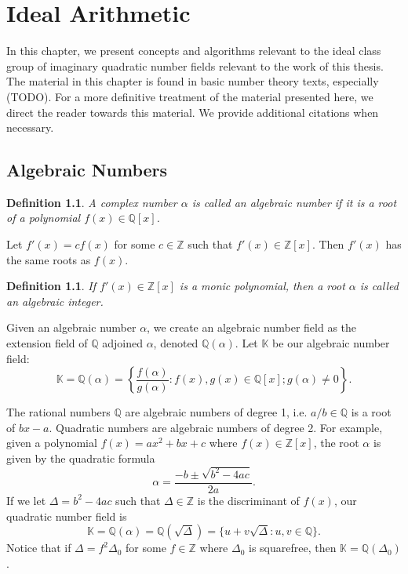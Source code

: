 \documentclass{ucalgthes1}
\newtheorem{defn}[thm]{Definition}
\newcommand{\KK}{\mathbb{K}}
\newcommand{\ZZ}{\mathbb{Z}}
\newcommand{\QQ}{\mathbb{Q}}
\begin{document}
\setcounter{chapter}{1}
\chapter{Ideal Arithmetic}

In this chapter, we present concepts and algorithms relevant to the ideal class group of imaginary quadratic number fields relevant to the work of this thesis.  The material in this chapter is found in basic number theory texts, especially (TODO).  For a more definitive treatment of the material presented here, we direct the reader towards this material.  We provide additional citations when necessary.  

\section{Algebraic Numbers}

\begin{defn}
A complex number $\alpha$ is called an \emph{algebraic number} if it is a root of a polynomial $f(x) \in \QQ[x]$.
\end{defn}
Let $f'(x) = cf(x)$ for some $c \in \ZZ$ such that $f'(x) \in \ZZ[x]$.  Then $f'(x)$ has the same roots as $f(x)$.  
\begin{defn}
If $f'(x) \in \ZZ[x]$ is a monic polynomial, then a root $\alpha$ is called an \emph{algebraic integer}. 
\end{defn}
Given an algebraic number $\alpha$, we create an algebraic number field as the extension field of $\QQ$ adjoined $\alpha$, denoted $\QQ(\alpha)$. Let $\KK$ be our algebraic number field:
\[
	\KK = \QQ(\alpha) = \left\{ \frac{f(\alpha)}{g(\alpha)} : f(x), g(x) \in \QQ[x]; g(\alpha) \ne 0 \right\}.
\]

\bigbreak
The rational numbers $\QQ$ are algebraic numbers of degree 1, i.e. $a/b \in \QQ$ is a root of $bx - a$.  Quadratic numbers are algebraic numbers of degree 2.  For example, given a polynomial $f(x) = ax^2 + bx + c$ where $f(x) \in \ZZ[x]$, the root $\alpha$ is given by the quadratic formula
\[
	\alpha = \frac{-b \pm \sqrt{b^2 - 4ac}}{2a}.
\]
If we let $\Delta = b^2 -4ac$ such that $\Delta \in \ZZ$ is the discriminant of $f(x)$, our quadratic number field is 
\[
	\KK = \QQ(\alpha) = \QQ(\sqrt{\Delta}) = \{u + v\sqrt{\Delta} : u,v \in \QQ\}.
\]
Notice that if $\Delta = f^2 \Delta_0$ for some $f \in \ZZ$ where $\Delta_0$ is squarefree, then $\KK = \QQ(\Delta_0)$.
\end{document}
